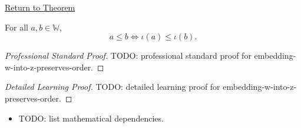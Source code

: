 \newpage
{}
\label{prf:embedding-w-into-z-preserves-order}

\begin{remark*}[Return]
\hyperref[thm:embedding-w-into-z-preserves-order]{Return to Theorem}
\end{remark*}

\begin{theorem*}
For all $a,b\in\mathbb{W}$,
\[
a\le b \Longleftrightarrow \iota(a)\le\iota(b).
\]
\end{theorem*}

\begin{proof}[Professional Standard Proof]
\LRAProofBodyStart
TODO: professional standard proof for embedding-w-into-z-preserves-order.
\end{proof}

\begin{proof}[Detailed Learning Proof]
\LRAProofBodyStart
TODO: detailed learning proof for embedding-w-into-z-preserves-order.
\end{proof}

\begin{remark*}
\end{remark*}

\begin{dependencies}
\begin{itemize}
  \item TODO: list mathematical dependencies.
\end{itemize}
\end{dependencies}

\clearpage
